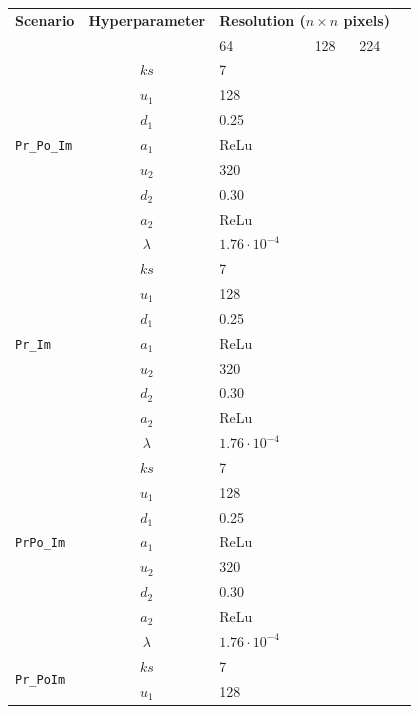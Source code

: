 \documentclass[Journal,letterpaper, SingleSpace, InsideFigs]{ascelike-new}
\begin{document}
\begin{table}[h!]\small
    \centering
    \begin{tabular}{l  c  p{1.75cm} p{1.75cm}  p{1.75cm} p{1.75cm}}\toprule
    \bf Scenario & \bf Hyperparameter & \multicolumn{3}{c}{\bf Resolution ($n\times n$ pixels)} \\
    &         & 64 & 128 & 224   \\\midrule
    \multirow{7}{*}{\texttt{Pr\_Po\_Im}} 
        & $ks$    & 7 &  &     \\
        & $u_1$   & 128 &  &     \\
        & $d_1$   & 0.25 &  &     \\
        & $a_1$   & ReLu  &  &      \\
        & $u_2$   & 320 &  &    \\
        & $d_2$   & 0.30 &  &     \\
        & $a_2$   & ReLu &  &     \\
        & $\lambda$  & $1.76\cdot 10^{-4}$ &  &      \\ \midrule
    \multirow{7}{*}{\texttt{Pr\_Im}} 
        & $ks$    & 7 &  &      \\
        & $u_1$   & 128 &  &     \\
        & $d_1$   & 0.25 &  &      \\
        & $a_1$   & ReLu  &  &      \\
        & $u_2$   & 320 &  &      \\
        & $d_2$   & 0.30 &  &     \\
        & $a_2$   & ReLu &  &      \\
        & $\lambda$  & $1.76\cdot 10^{-4}$ &  &      \\ \midrule
    \multirow{7}{*}{\texttt{PrPo\_Im}} 
        & $ks$    & 7 &  &    \\
        & $u_1$   & 128 &  &     \\
        & $d_1$   & 0.25 &  &      \\
        & $a_1$   & ReLu  &  &     \\
        & $u_2$   & 320 &  &     \\
        & $d_2$   & 0.30 &  &     \\
        & $a_2$   & ReLu &  &      \\
        & $\lambda$  & $1.76\cdot 10^{-4}$ &  &     \\ \midrule
    \multirow{7}{*}{\texttt{Pr\_PoIm}}  
        & $ks$    & 7 &  &      \\
        & $u_1$   & 128 &  &      \\

\end{tabular}
\end{table}
\end{document}
